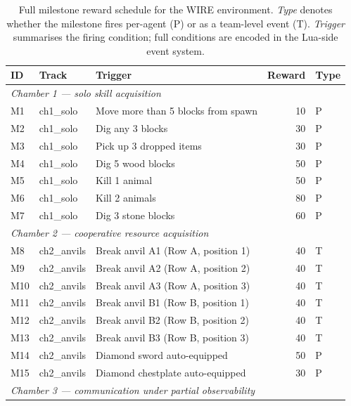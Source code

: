 \begin{table}[t]
\centering
\caption{Full milestone reward schedule for the WIRE environment. \emph{Type} denotes whether the milestone fires per-agent (P) or as a team-level event (T). \emph{Trigger} summarises the firing condition; full conditions are encoded in the Lua-side event system.}
\label{tab:milestone_schedule}
\small
\begin{tabular}{lllrl}
\toprule
ID & Track & Trigger & Reward & Type \\
\midrule
\multicolumn{5}{l}{\emph{Chamber 1 --- solo skill acquisition}} \\
M1  & ch1\_solo     & Move more than 5 blocks from spawn      & 10   & P \\
M2  & ch1\_solo     & Dig any 3 blocks                        & 30   & P \\
M3  & ch1\_solo     & Pick up 3 dropped items                 & 30   & P \\
M4  & ch1\_solo     & Dig 5 wood blocks                       & 50   & P \\
M5  & ch1\_solo     & Kill 1 animal                           & 50   & P \\
M6  & ch1\_solo     & Kill 2 animals                          & 80   & P \\
M7  & ch1\_solo     & Dig 3 stone blocks                      & 60   & P \\
\midrule
\multicolumn{5}{l}{\emph{Chamber 2 --- cooperative resource acquisition}} \\
M8  & ch2\_anvils   & Break anvil A1 (Row A, position 1)       & 40   & T \\
M9  & ch2\_anvils   & Break anvil A2 (Row A, position 2)       & 40   & T \\
M10 & ch2\_anvils   & Break anvil A3 (Row A, position 3)       & 40   & T \\
M11 & ch2\_anvils   & Break anvil B1 (Row B, position 1)       & 40   & T \\
M12 & ch2\_anvils   & Break anvil B2 (Row B, position 2)       & 40   & T \\
M13 & ch2\_anvils   & Break anvil B3 (Row B, position 3)       & 40   & T \\
M14 & ch2\_anvils   & Diamond sword auto-equipped              & 50   & P \\
M15 & ch2\_anvils   & Diamond chestplate auto-equipped         & 30   & P \\
\midrule
\multicolumn{5}{l}{\emph{Chamber 3 --- communication under partial observability}} \\

\end{tabular}
\end{table}
